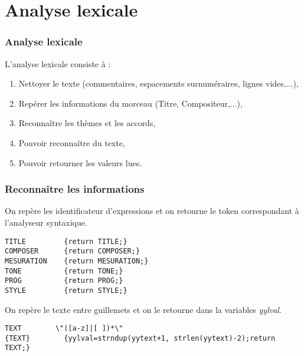 \documentclass{beamer}
\begin{document}
\section{Analyse lexicale}
\begin{frame}
\frametitle{Analyse lexicale}
L'analyse lexicale consiste à :
\begin{enumerate}
\item Nettoyer le texte (commentaires, espacements surnuméraires, lignes vides,...),\\
\item Repérer les informations du morceau (Titre, Compositeur,...),\\
\item Reconnaître les thèmes et les accords,\\
\item Pouvoir reconnaître du texte,
\item Pouvoir retourner les valeurs lues.
\end{enumerate}
\end{frame}

\begin{frame}[fragile]
\frametitle{Reconnaître les informations}

On repère les identificateur d'expressions et on retourne le token correspondant à l'analyseur syntaxique.
\begin{tiny}
\begin{verbatim}
TITLE         {return TITLE;}
COMPOSER      {return COMPOSER;}
MESURATION    {return MESURATION;}
TONE          {return TONE;}
PROG          {return PROG;}
STYLE         {return STYLE;}
\end{verbatim}
\end{tiny}

On repère le texte entre guillemets et on le retourne dans la variables \textit{yylval}.
\begin{tiny}
\begin{verbatim}
TEXT        \"([a-z]|[ ])*\"
{TEXT}        {yylval=strndup(yytext+1, strlen(yytext)-2);return TEXT;}
\end{verbatim}
\end{tiny}


\end{frame}
\end{document}
